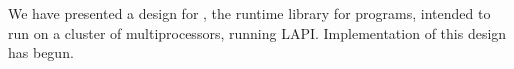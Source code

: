 We have presented a design for \Xtenlib, the runtime library for
\Xten{} programs, intended to run on a cluster of multiprocessors,
running LAPI. Implementation of this design has begun.
